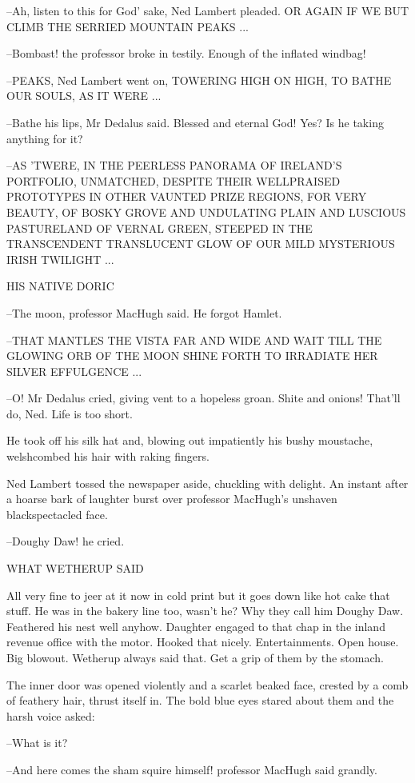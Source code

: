 --Ah, listen to this for God' sake, Ned Lambert pleaded. OR AGAIN IF WE
BUT CLIMB THE SERRIED MOUNTAIN PEAKS ...

--Bombast! the professor broke in testily. Enough of the inflated
windbag!

--PEAKS, Ned Lambert went on, TOWERING HIGH ON HIGH, TO BATHE OUR SOULS,
AS IT WERE ...

--Bathe his lips, Mr Dedalus said. Blessed and eternal God! Yes? Is he
taking anything for it?

--AS 'TWERE, IN THE PEERLESS PANORAMA OF IRELAND'S PORTFOLIO, UNMATCHED,
DESPITE THEIR WELLPRAISED PROTOTYPES IN OTHER VAUNTED PRIZE REGIONS, FOR
VERY BEAUTY, OF BOSKY GROVE AND UNDULATING PLAIN AND LUSCIOUS PASTURELAND
OF VERNAL GREEN, STEEPED IN THE TRANSCENDENT TRANSLUCENT GLOW OF OUR MILD
MYSTERIOUS IRISH TWILIGHT ...


    HIS NATIVE DORIC


--The moon, professor MacHugh said. He forgot Hamlet.

--THAT MANTLES THE VISTA FAR AND WIDE AND WAIT TILL THE GLOWING ORB OF
THE MOON SHINE FORTH TO IRRADIATE HER SILVER EFFULGENCE ...

--O! Mr Dedalus cried, giving vent to a hopeless groan. Shite and onions!
That'll do, Ned. Life is too short.

He took off his silk hat and, blowing out impatiently his bushy
moustache, welshcombed his hair with raking fingers.

Ned Lambert tossed the newspaper aside, chuckling with delight. An
instant after a hoarse bark of laughter burst over professor MacHugh's
unshaven blackspectacled face.

--Doughy Daw! he cried.


    WHAT WETHERUP SAID


All very fine to jeer at it now in cold print but it goes down like hot
cake that stuff. He was in the bakery line too, wasn't he? Why they call
him Doughy Daw. Feathered his nest well anyhow. Daughter engaged to that
chap in the inland revenue office with the motor. Hooked that nicely.
Entertainments. Open house. Big blowout. Wetherup always said that. Get
a grip of them by the stomach.

The inner door was opened violently and a scarlet beaked face,
crested by a comb of feathery hair, thrust itself in. The bold blue eyes
stared about them and the harsh voice asked:

--What is it?

--And here comes the sham squire himself! professor MacHugh said grandly.

